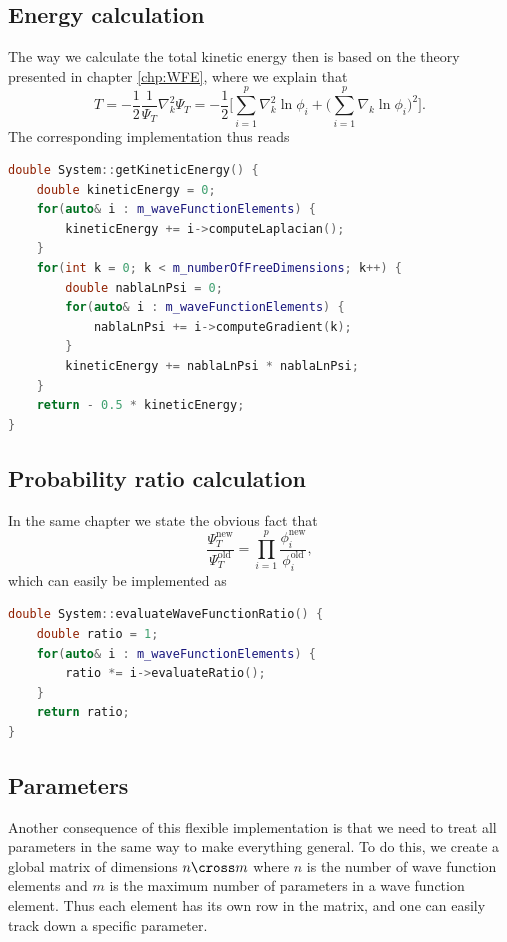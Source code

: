 \subsection{Energy calculation}
The way we calculate the total kinetic energy then is based on the theory presented in chapter \ref{chp:WFE}, where we explain that
\begin{equation}
T=-\frac{1}{2}\frac{1}{\Psi_T}\nabla_k^2\Psi_T=-\frac{1}{2}\bigg[\sum_{i=1}^p\nabla_k^2\ln\phi_i + \Big(\sum_{i=1}^p\nabla_k\ln\phi_i\Big)^2\bigg].
\end{equation}
The corresponding implementation thus reads
\lstset{basicstyle=\scriptsize}
\begin{lstlisting}[language=c++,caption={from \texttt{system.cpp}}]
double System::getKineticEnergy() {
    double kineticEnergy = 0;
    for(auto& i : m_waveFunctionElements) {
        kineticEnergy += i->computeLaplacian();
    }
    for(int k = 0; k < m_numberOfFreeDimensions; k++) {
        double nablaLnPsi = 0;
        for(auto& i : m_waveFunctionElements) {
            nablaLnPsi += i->computeGradient(k);
        }
        kineticEnergy += nablaLnPsi * nablaLnPsi;
    }
    return - 0.5 * kineticEnergy;
}
\end{lstlisting}

\subsection{Probability ratio calculation}
In the same chapter we state the obvious fact that 
\begin{equation*}
	\frac{\Psi_T^{\text{new}}}{\Psi_T^{\text{old}}}=\prod_{i=1}^p\frac{\phi_i^{\text{new}}}{\phi_i^{\text{old}}},
\end{equation*}
which can easily be implemented as
\lstset{basicstyle=\scriptsize}
\begin{lstlisting}[language=c++,caption={from \texttt{system.cpp}}]
double System::evaluateWaveFunctionRatio() {
    double ratio = 1;
    for(auto& i : m_waveFunctionElements) {
        ratio *= i->evaluateRatio();
    }
    return ratio;
}
\end{lstlisting}

\subsection{Parameters}
Another consequence of this flexible implementation is that we need to treat all parameters in the same way to make everything general. To do this, we create a global matrix of dimensions $n \cross m$ where $n$ is the number of wave function elements and $m$ is the maximum number of parameters in a wave function element. Thus each element has its own row in the matrix, and one can easily track down a specific parameter. 

